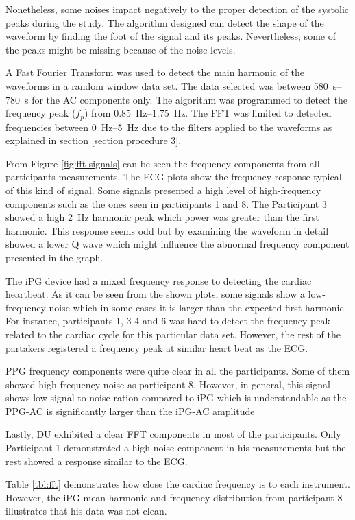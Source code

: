 Nonetheless, some noises impact negatively to the proper detection of the systolic peaks during the study. The algorithm designed can detect the shape of the waveform by finding the foot of the signal and its peaks. Nevertheless, some of the peaks might be missing because of the noise levels.

A Fast Fourier Transform was used to detect the main harmonic of the waveforms in a random window data set. The data selected was between \SIrange{580}{780}{\second} for the AC components only. The algorithm was programmed to detect the frequency peak ($f_p$) from \SIrange{0.85}{1.75}{\hertz}. The FFT was limited to detected frequencies between \SIrange{0}{5}{\hertz} due to the filters applied to the waveforms as explained in section \ref{section procedure 3}.

From Figure \ref{fig:fft signals} can be seen the frequency components from all participants measurements. The ECG plots show the frequency response typical of this kind of signal. Some signals presented a high level of high-frequency components such as the ones seen in participants 1 and 8. The Participant 3 showed a high \SI{2}{\hertz} harmonic peak which power was greater than the first harmonic. This response seems odd but by examining the waveform in detail showed a lower Q wave which might influence the abnormal frequency component presented in the graph.

The iPG device had a mixed frequency response to detecting the cardiac heartbeat. As it can be seen from the shown plots, some signals show a low-frequency noise which in some cases it is larger than the expected first harmonic. For instance, participants 1, 3 4 and 6 was hard to detect the frequency peak related to the cardiac cycle for this particular data set. However, the rest of the partakers registered a frequency peak at similar heart beat as the ECG. 

PPG frequency components were quite clear in all the participants. Some of them showed high-frequency noise as participant 8. However, in general, this signal shows low signal to noise ration compared to iPG which is understandable as the PPG-AC is significantly larger than the iPG-AC amplitude

Lastly, DU exhibited a clear FFT components in most of the participants. Only Participant 1 demonstrated a high noise component in his measurements but the rest showed a response similar to the ECG. 

Table \ref{tbl:fft} demonstrates how close the cardiac frequency is to each instrument. However, the iPG mean harmonic and frequency distribution from participant 8 illustrates that his data was not clean.


